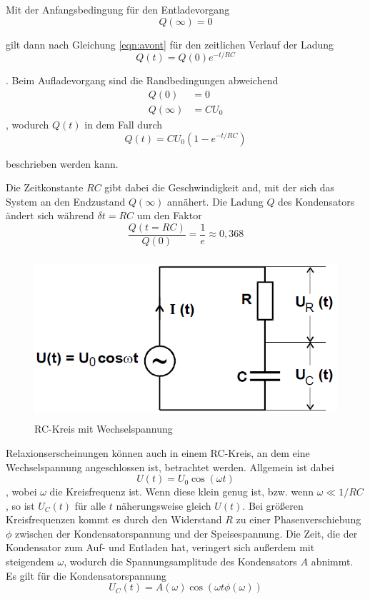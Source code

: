 Mit der Anfangsbedingung für den Entladevorgang
\begin{equation}
    Q(\infty) = 0
\end{equation}

gilt dann nach Gleichung \ref{eqn:avont} für den zeitlichen Verlauf der Ladung
\begin{equation}
    Q(t) = Q(0) e^{-t/{RC}}
\end{equation}

. Beim Aufladevorgang sind die Randbedingungen abweichend
\begin{align*}
    Q(0)        &= 0 \\
    Q(\infty)   &= CU_0 
\end{align*}, wodurch $Q(t)$ in dem Fall durch
\begin{equation}
    Q(t) = CU_0 (1 - e^{-t/{RC}})
    \label{eqn:RC}
\end{equation}

beschrieben werden kann.

Die Zeitkonstante $RC$ gibt dabei die Geschwindigkeit and, mit der sich das System 
an den Endzustand $Q(\infty)$ annähert. Die Ladung $Q$ des Kondensators ändert sich während $\delta t=RC$ um
den Faktor
\begin{equation*}
    \frac{Q(t=RC)}{Q(0)} = \frac{1}e \approx 0,368 
\end{equation*} 


\begin{figure}
    \centering
    \includegraphics[height=6cm]{data/bild_2}
    \caption{RC-Kreis mit Wechselspannung}
    \label{fig:bild_2}
\end{figure}
\FloatBarrier
Relaxionserscheinungen können auch in einem RC-Kreis, an dem eine Wechselspannung angeschlossen ist, betrachtet werden. 
Allgemein ist dabei \begin{equation}
    U(t) = U_0 \cos(\omega t)
\end{equation}, wobei $\omega$ die Kreisfrequenz ist. Wenn diese klein genug ist, bzw. wenn $\omega \ll 1/RC$, so ist $U_C (t)$
für alle $t$ näherungsweise gleich $U(t)$. Bei größeren Kreisfrequenzen kommt es durch den Widerstand $R$ zu einer Phasenverschiebung
$\phi$ zwischen der Kondensatorspannung und der Speisespannung. Die Zeit, die der Kondensator zum Auf- und Entladen hat, veringert sich 
außerdem mit steigendem $\omega$, wodurch die Spannungsamplitude des Kondensators $A$ abnimmt. Es gilt für die Kondensatorspannung 
\begin{equation}
    U_C (t) = A(\omega) \cos(\omega t \phi(\omega))
\end{equation}

